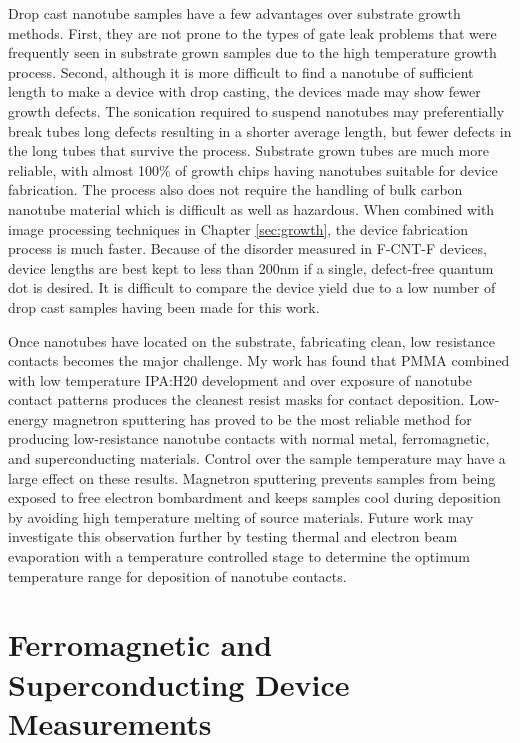 Drop cast nanotube samples have a few advantages over substrate growth methods. First, they are not prone to the types of gate leak problems that were frequently seen in substrate grown samples due to the high temperature growth process. Second, although it is more difficult to find a nanotube of sufficient length to make a device with drop casting, the devices made may show fewer growth defects. The sonication required to suspend nanotubes may preferentially break tubes long defects resulting in a shorter average length, but fewer defects in the long tubes that survive the process. Substrate grown tubes are much more reliable, with almost 100\% of growth chips having nanotubes suitable for device fabrication. The process also does not require the handling of bulk carbon nanotube material which is difficult as well as hazardous. When combined with image processing techniques in Chapter \ref{sec:growth}, the device fabrication process is much faster. Because of the disorder measured in F-CNT-F devices, device lengths are best kept to less than 200nm if a single, defect-free quantum dot is desired. It is difficult to compare the device yield due to a low number of drop cast samples having been made for this work.

Once nanotubes have located on the substrate, fabricating clean, low resistance contacts becomes the major challenge. My work has found that PMMA combined with low temperature IPA:H20 development and over exposure of nanotube contact patterns produces the cleanest resist masks for contact deposition. Low-energy magnetron sputtering has proved to be the most reliable method for producing low-resistance nanotube contacts with normal metal, ferromagnetic, and superconducting materials. Control over the sample temperature may have a large effect on these results. Magnetron sputtering prevents samples from being exposed to free electron bombardment and keeps samples cool during deposition by avoiding high temperature melting of source materials. Future work may investigate this observation further by testing thermal and electron beam evaporation with a temperature controlled stage to determine the optimum temperature range for deposition of nanotube contacts.

\section{Ferromagnetic and Superconducting Device Measurements}

